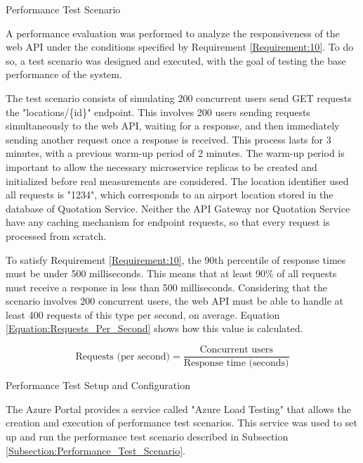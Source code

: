 \documentclass[12pt, reqno, oneside]{amsbook}
\makeatletter
\def\subsection{\@startsection{subsection}{2}%
      \z@{.5\linespacing\@plus.7\linespacing}{.25\linespacing}%
      {\normalfont\bfseries\flushleft}}
\theoremstyle{definition}
\theoremstyle{definition}
\numberwithin{section}{chapter}
\numberwithin{table}{chapter}
\numberwithin{figure}{chapter}
\makeatother
\begin{document}
\subsection{Performance Test Scenario}
\label{Subsection:Performance_Test_Scenario}

A performance evaluation was performed to analyze the responsiveness of the web \ac{API} under the conditions specified by Requirement \ref{Requirement:10}. To do so, a test scenario was designed and executed, with the goal of testing the base performance of the system.

The test scenario consists of simulating 200 concurrent users send GET requests the "locations/\{id\}" endpoint. This involves 200 users sending requests simultaneously to the web \ac{API}, waiting for a response, and then immediately sending another request once a response is received. This process lasts for 3 minutes, with a previous warm-up period of 2 minutes. The warm-up period is important to allow the necessary microservice replicas to be created and initialized before real measurements are considered. The location identifier used all requests is "1234", which corresponds to an airport location stored in the database of Quotation Service. Neither the \ac{API} Gateway nor Quotation Service have any caching mechanism for endpoint requests, so that every request is processed from scratch.

To satisfy Requirement \ref{Requirement:10}, the 90th percentile of response times must be under 500 milliseconds. This means that at least 90\% of all requests must receive a response in less than 500 milliseconds. Considering that the scenario involves 200 concurrent users, the web \ac{API} must be able to handle at least 400 requests of this type per second, on average. Equation \ref{Equation:Requests_Per_Second} shows how this value is calculated.

\begin{equation}
  \text{Requests (per second)} = \frac{\text{Concurrent users}}{\text{Response time (seconds)}}
  \label{Equation:Requests_Per_Second}
\end{equation}

\subsection{Performance Test Setup and Configuration}

The Azure Portal provides a service called "Azure Load Testing" that allows the creation and execution of performance test scenarios. This service was used to set up and run the performance test scenario described in Subsection \ref{Subsection:Performance_Test_Scenario}.
\end{document}
